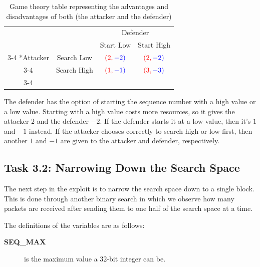\documentclass[letterpaper,12pt]{report}
\begin{document}
\begin{sloppypar}
\begin{table}[ht]
    \setlength{\extrarowheight}{2pt}
    \begin{tabular}{cc|c|c|}
        & \multicolumn{1}{c}{} & \multicolumn{2}{c}{\color{blue}Defender}\\
        & \multicolumn{1}{c}{} & \multicolumn{1}{c}{\color{blue}Start Low}  & \multicolumn{1}{c}{\color{blue}Start High} \\\cline{3-4}
        \color{red}\multirow{2}*{Attacker}  & \color{red}Search Low & $\color{red}(2,\color{blue}-2)$ & $\color{red}(2,\color{blue}-2)$ \\\cline{3-4}
        & \color{red}Search High & $\color{red}(1,\color{blue}-1)$ & $\color{red}(3,\color{blue}-3)$ \\\cline{3-4}
    \end{tabular}
    \caption{Game theory table representing the advantages and disadvantages of both (the attacker and the defender)}
    \label{Tab:game_theory}
\end{table}

The defender has the option of starting the sequence number with a high value or a low value. Starting with a high value costs more resources, so it gives the attacker $2$ and the defender $-2$. If the defender starts it at a low value, then it's $1$ and $-1$ instead. If the attacker chooses correctly to search high or low first, then another $1$ and $-1$ are given to the attacker and defender, respectively.

\subsection*{Task 3.2: Narrowing Down the Search Space}\label{sec:Task-3.2-Narrowing-Down-the-Search-Space}

The next step in the exploit is to narrow the search space down to a single block. This is done through another binary search in which we observe how many packets are received after sending them to one half of the search space at a time.

The definitions of the variables are as follows:

\bigskip

\begin{description}
    \item[\textbf{SEQ\_MAX}] \begin{sloppypar}is the maximum value a 32-bit integer can be.\end{sloppypar}


\end{description}
\end{sloppypar}
\end{document}
